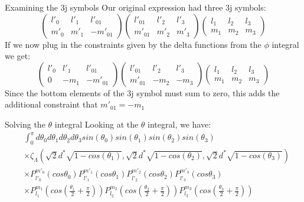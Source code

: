 \documentclass{beamer}
\begin{document}
    \begin{frame}{Examining the 3j symbols}
        Our original expression had three 3j symbols:
        \begin{equation*}
            \begin{pmatrix}
                l'_0 & l'_1 & l'_{01}\\
                m'_0 & m'_1 & -m'_{01}
            \end{pmatrix}
            \begin{pmatrix}
                l'_{01} & l'_2 & l'_{3}\\
                m'_{01} & m'_2 & m'_{3}
            \end{pmatrix}
            \begin{pmatrix}
                l_{1} & l_2 & l_{3}\\
                m_{1} & m_2 & m_{3}
            \end{pmatrix}
        \end{equation*}
        If we now plug in the constraints given by the delta functions from the $\phi$ integral we get:
        \begin{equation*}
            \begin{pmatrix}
                l'_0 & l'_1 & l'_{01}\\
                0 & -m_1 & -m'_{01}
            \end{pmatrix}
            \begin{pmatrix}
                l'_{01} & l'_2 & l'_{3}\\
                m'_{01} & -m_2 & -m_{3}
            \end{pmatrix}
            \begin{pmatrix}
                l_{1} & l_2 & l_{3}\\
                m_{1} & m_2 & m_{3}
            \end{pmatrix}
        \end{equation*}
        Since the bottom elements of the 3j symbol must sum to zero, this adds the additional constraint that $m'_{01}=-m_1$
    \end{frame}

    \begin{frame}{Solving the $\theta$ integral}
        Looking at the $\theta$ integral, we have:
        \begin{align*}
            &\int_0^{\pi} d\theta_0 d\theta_1 d\theta_2 d\theta_3 sin(\theta_0) sin(\theta_1) sin(\theta_2) sin(\theta_3)\\
            &\times \zeta_{\Lambda}(\sqrt{2}d^*\sqrt{1-cos(\theta_1)}, \sqrt{2}d^*\sqrt{1-cos(\theta_2)}, \sqrt{2}d^*\sqrt{1-cos(\theta_3)})\\
            &\times P_{l'_0}^{m'_0}(cos \theta_0) P_{l'_1}^{m'_1}(cos \theta_1) P_{l'_2}^{m'_2}(cos \theta_2) P_{l'_3}^{m'_3}(cos \theta_3) \\
            &\times P_{l_1}^{m_1}(cos (\frac{\theta_1}{2} + \frac{\pi}{2})) P_{l_2}^{m_2}(cos (\frac{\theta_2}{2} + \frac{\pi}{2})) P_{l_3}^{m_3}(cos (\frac{\theta_3}{2} + \frac{\pi}{2}))
        \end{align*}
    \end{frame}
\end{document}
